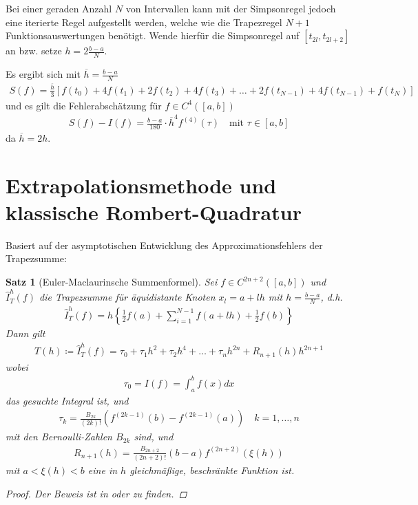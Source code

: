 \documentclass[ngerman,fontsize=11pt, paper=a4, parskip=half, titlepage=true, toc=bib]{scrbook}
\theoremstyle{definition}
\theoremstyle{plain}
\newtheorem{Satz}[Def]{Satz}		%
\newcommand{\sectione}[1]{ \setcounter{equation}{0}\section{#1}}
\newenvironment{Satze}[1][]{ %
  \begin{Satz}[#1]  }
  { \end{Satz}
  \addtocounter{subsection}{1}}
\begin{document}
Bei einer geraden Anzahl $N$ von Intervallen kann mit der
Simpsonregel jedoch eine iterierte Regel aufgestellt werden,
welche wie die Trapezregel $N+1$ Funktionsauswertungen benötigt.
Wende hierfür die Simpsonregel auf $[t_{2l}, t_{2l+2}]$ an
bzw. setze $h=2\frac{b-a}{N}$.

Es ergibt sich mit $\overline{h}= \frac{b-a}{N}$
\begin{gather}
  S(f) = \frac{\overline{h}}{3}\left[
    f(t_0)+4f(t_1) + 2f(t_2) + 4f(t_3) +
    \ldots + 2f(t_{N-1}) + 4f(t_{N-1}) + f(t_N)
  \right]
  \label{VII.2.16}
\end{gather}
und es gilt die Fehlerabschätzung für $f\in C^4([a,b])$
\begin{gather}
  S(f)-I(f)=
  \frac{b-a}{180}\cdot\overline{h}^4f^{(4)}(\tau)
  \quad \text{mit } \tau \in[a,b]
  \label{VII.2.17}
\end{gather}
da $\overline{h}= 2h$.


\sectione{Extrapolationsmethode und
  klassische Rombert-Quadratur}
Basiert auf der asymptotischen
Entwicklung
des Approximationsfehlers der
Trapezsumme:

\begin{Satze}[Euler-Maclaurinsche
  Summenformel]
  Sei $f\in C^{2n+2}([a,b])$ und 
  $\hat{I}_T^h(f)$ die Trapezsumme
  für äquidistante Knoten $x_l=a+lh$
  mit $h=\frac{b-a}{N}$, d.h.
  \begin{gather}
    \hat{I}_T^h(f) = h\left\{
      \frac{1}{2}f(a) + \sum_{i=1}^{N-1}f(a+lh) +
      \frac{1}{2}f(b)
    \right\}
    \label{VII.3.1}
  \end{gather}
  Dann gilt
  \begin{gather}
    T(h) \coloneqq \hat{I}_T^h(f) = \tau_0+\tau_1h^2+\tau_2h^4
    +\ldots + \tau_nh^{2n}+ R_{n+1}(h)h^{2n+1}
  \end{gather}
  wobei
  \begin{gather}
    \tau_0 = I(f) = \int_a^bf(x)dx
    \label{VII.3.3}
  \end{gather}
  das gesuchte Integral ist, und
  \begin{gather*}
    \tau_k = \frac{B_{2k}}{(2k)!}
    \left(f^{(2k-1)}(b)-f^{(2k-1)}(a)\right)
    \quad k=1,\ldots, n
  \end{gather*}
  mit den Bernoulli-Zahlen $B_{2k}$ sind, und
  \begin{gather*}
    R_{n+1}(h) =
    \frac{B_{2n+2}}{(2n+2)!}(b-a)f^{(2n+2)}(\xi(h))
  \end{gather*}
  mit $a<\xi(h)<b$ eine in $h$
  gleichmäßige, beschränkte Funktion
  ist.

  \begin{proof}
    Der Beweis ist in
    \cite{stoerbulirsch} 
    oder \cite{haemmerlinhoffmann} zu finden.
  \end{proof}
\end{Satze}
\end{document}

